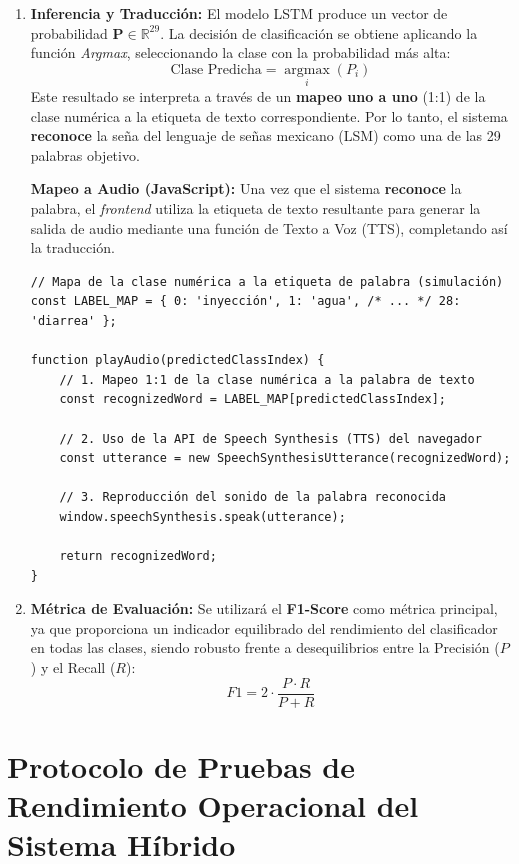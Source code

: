 \begin{enumerate}
    \item \textbf{Inferencia y Traducción:} El modelo LSTM produce un vector de probabilidad $\mathbf{P} \in \mathbb{R}^{29}$. La decisión de clasificación se obtiene aplicando la función \textit{Argmax}, seleccionando la clase con la probabilidad más alta:
    \begin{equation}
        \text{Clase Predicha} = \underset{i}{\operatorname{argmax}} (P_i)
    \end{equation}
    Este resultado se interpreta a través de un \textbf{mapeo uno a uno} (1:1) de la clase numérica a la etiqueta de texto correspondiente. Por lo tanto, el sistema \textbf{reconoce} la seña del lenguaje de señas mexicano (LSM) como una de las 29 palabras objetivo.

    \textbf{Mapeo a Audio (JavaScript):} Una vez que el sistema \textbf{reconoce} la palabra, el \textit{frontend} utiliza la etiqueta de texto resultante para generar la salida de audio mediante una función de Texto a Voz (TTS), completando así la traducción.
    \begin{verbatim}
// Mapa de la clase numérica a la etiqueta de palabra (simulación)
const LABEL_MAP = { 0: 'inyección', 1: 'agua', /* ... */ 28: 'diarrea' };

function playAudio(predictedClassIndex) {
    // 1. Mapeo 1:1 de la clase numérica a la palabra de texto
    const recognizedWord = LABEL_MAP[predictedClassIndex];

    // 2. Uso de la API de Speech Synthesis (TTS) del navegador
    const utterance = new SpeechSynthesisUtterance(recognizedWord);

    // 3. Reproducción del sonido de la palabra reconocida
    window.speechSynthesis.speak(utterance);

    return recognizedWord;
}
    \end{verbatim}

    \item \textbf{Métrica de Evaluación:} Se utilizará el \textbf{F1-Score} como métrica principal, ya que proporciona un indicador equilibrado del rendimiento del clasificador en todas las clases, siendo robusto frente a desequilibrios entre la Precisión ($P$) y el Recall ($R$):
    \begin{equation}
        F1 = 2 \cdot \frac{P \cdot R}{P + R}
    \end{equation}
\end{enumerate}

\section{Protocolo de Pruebas de Rendimiento Operacional del Sistema Híbrido}
\label{sec:protocolo_rendimiento}

